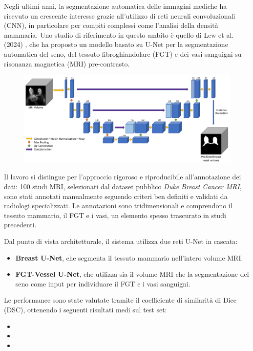Negli ultimi anni, la segmentazione automatica delle immagini mediche ha ricevuto un crescente interesse grazie all’utilizzo di reti neurali convoluzionali (CNN), in particolare per compiti complessi come l’analisi della densità mammaria. Uno studio di riferimento in questo ambito è quello di Lew et al. (2024) \cite{lew2024segmentation}, che ha proposto un modello basato su U-Net per la segmentazione automatica del seno, del tessuto fibroghiandolare (FGT) e dei vasi sanguigni su risonanza magnetica (MRI) pre-contrasto.

\begin{figure}[H] 
  	\centering 
 	\includegraphics[width=\textwidth]{images/2025-07-07-12-01-04.png} 
    \label{fig:Overview dei dati di input e la U-NET usata per la segmentazione del seno.}
 \end{figure} 

Il lavoro si distingue per l’approccio rigoroso e riproducibile all’annotazione dei dati: 100 studi MRI, selezionati dal dataset pubblico \textit{Duke Breast Cancer MRI}, sono stati annotati manualmente seguendo criteri ben definiti e validati da radiologi specializzati. Le annotazioni sono tridimensionali e comprendono il tessuto mammario, il FGT e i vasi, un elemento spesso trascurato in studi precedenti.

Dal punto di vista architetturale, il sistema utilizza due reti U-Net in cascata:
\begin{itemize}
\item \textbf{Breast U-Net}, che segmenta il tessuto mammario nell’intero volume MRI.
\item \textbf{FGT-Vessel U-Net}, che utilizza sia il volume MRI che la segmentazione del seno come input per individuare il FGT e i vasi sanguigni.
\end{itemize}

Le performance sono state valutate tramite il coefficiente di similarità di Dice (DSC), ottenendo i seguenti risultati medi sul test set:
\begin{itemize}
\item {}
\item {}
\item {}
\end{itemize}

